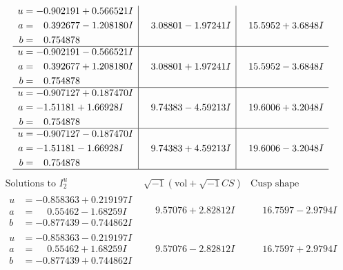 \documentclass[1p]{elsarticle_modified}
\theoremstyle{definition}
\newcommand{\I}{\sqrt{-1}}
\begin{document}
$$\begin{array}{c|c|c}
\begin{aligned}
u &= -0.902191 + 0.566521 I \\
a &= \phantom{-}0.392677 - 1.208180 I \\
b &= \phantom{-}0.754878\phantom{ +0.000000I}\end{aligned}
 & \phantom{-}3.08801 - 1.97241 I & \phantom{-}15.5952 + 3.6848 I \\ \hline\begin{aligned}
u &= -0.902191 - 0.566521 I \\
a &= \phantom{-}0.392677 + 1.208180 I \\
b &= \phantom{-}0.754878\phantom{ +0.000000I}\end{aligned}
 & \phantom{-}3.08801 + 1.97241 I & \phantom{-}15.5952 - 3.6848 I \\ \hline\begin{aligned}
u &= -0.907127 + 0.187470 I \\
a &= -1.51181 + 1.66928 I \\
b &= \phantom{-}0.754878\phantom{ +0.000000I}\end{aligned}
 & \phantom{-}9.74383 - 4.59213 I & \phantom{-}19.6006 + 3.2048 I \\ \hline\begin{aligned}
u &= -0.907127 - 0.187470 I \\
a &= -1.51181 - 1.66928 I \\
b &= \phantom{-}0.754878\phantom{ +0.000000I}\end{aligned}
 & \phantom{-}9.74383 + 4.59213 I & \phantom{-}19.6006 - 3.2048 I\\
 \hline 
 \end{array}$$\newpage$$\begin{array}{c|c|c}  
\text{Solutions to }I^u_{2}& \I (\text{vol} + \sqrt{-1}CS) & \text{Cusp shape}\\
 \hline 
\begin{aligned}
u &= -0.858363 + 0.219197 I \\
a &= \phantom{-}0.55462 - 1.68259 I \\
b &= -0.877439 - 0.744862 I\end{aligned}
 & \phantom{-}9.57076 + 2.82812 I & \phantom{-}16.7597 - 2.9794 I \\ \hline\begin{aligned}
u &= -0.858363 - 0.219197 I \\
a &= \phantom{-}0.55462 + 1.68259 I \\
b &= -0.877439 + 0.744862 I\end{aligned}
 & \phantom{-}9.57076 - 2.82812 I & \phantom{-}16.7597 + 2.9794 I \\ \hline\begin{aligned}

\end{aligned}
\end{array}$$
\end{document}
